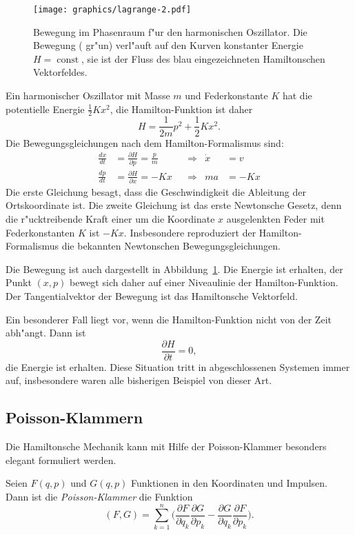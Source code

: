 \begin{beispiel}
\begin{figure}
\centering
\texttt{[image: graphics/lagrange-2.pdf]}
\caption{Bewegung im Phasenraum f"ur den harmonischen Oszillator.
Die Bewegung ({\color{green} gr"un}) verl"auft auf den Kurven konstanter
Energie $H=\operatorname{const}$, sie ist der Fluss des blau eingezeichneten
Hamiltonschen Vektorfeldes.
\label{skript:hamilton-harmonisch}}
\end{figure}
Ein harmonischer Oszillator
mit Masse $m$ und Federkonstante $K$ hat die potentielle Energie $\frac12Kx^2$,
die Hamilton-Funktion ist daher
\[
H=\frac1{2m}p^2+\frac12Kx^2.
\]
Die Bewegungsgleichungen nach dem Hamilton-Formalismus sind:
\begin{align*}
\frac{dx}{dt}&=\frac{\partial H}{\partial p}=\frac{p}{m}&&\Rightarrow&\dot x&=v\\
\frac{dp}{dt}&=\frac{\partial H}{\partial x}=-Kx&&\Rightarrow&ma&=-Kx
\end{align*}
Die erste Gleichung besagt, dass die Geschwindigkeit die Ableitung
der Ortskoordinate ist.
Die zweite Gleichung ist das erste Newtonsche Gesetz, denn die
r"ucktreibende Kraft einer um die Koordinate $x$ ausgelenkten Feder
mit Federkonstanten $K$ ist $-Kx$.
Insbesondere reproduziert der Hamilton-Formalismus die bekannten
Newtonschen Bewegungsgleichungen.

Die Bewegung ist auch dargestellt in Abbildung~\ref{skript:hamilton-harmonisch}.
Die Energie ist erhalten, der Punkt $(x,p)$ bewegt sich daher
auf einer Niveaulinie der Hamilton-Funktion.
Der Tangentialvektor der Bewegung ist das Hamiltonsche Vektorfeld.
\end{beispiel}

Ein besonderer Fall liegt vor, wenn die Hamilton-Funktion nicht von
der Zeit abh"angt. Dann ist
\[
\frac{\partial H}{\partial t}=0,
\]
die Energie ist erhalten. Diese Situation tritt in abgeschlossenen
Systemen immer auf, insbesondere waren alle bisherigen Beispiel
von dieser Art.

\subsection{Poisson-Klammern}
Die Hamiltonsche Mechanik kann mit Hilfe der Poisson-Klammer besonders
elegant formuliert werden.

\begin{definition}
Seien $F(q,p)$ und $G(q,p)$ Funktionen in den Koordinaten und Impulsen. 
Dann ist die {\em Poisson-Klammer} die Funktion
\[
(F,G)
=
\sum_{k=1}^n
\biggl(
\frac{\partial F}{\partial q_k}\frac{\partial G}{\partial p_k}
-
\frac{\partial G}{\partial q_k}\frac{\partial F}{\partial p_k}
\biggr).
\]
\end{definition}

